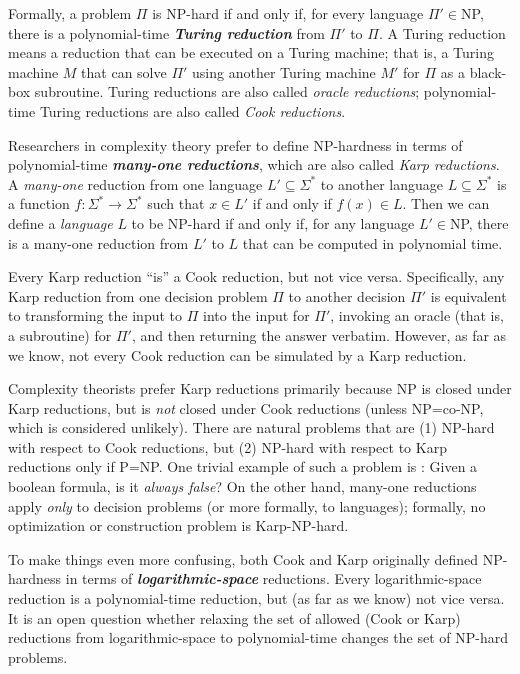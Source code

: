 Formally, a problem $\Pi$ is NP-hard if and only if, for every language $\Pi' \in{}$NP, there is a polynomial-time \textbf{\textit{Turing reduction}} from $\Pi'$ to $\Pi$.
A Turing reduction means a reduction that can be executed on a Turing machine; that is, a Turing machine $M$ that can solve $\Pi'$ using another Turing machine $M'$ for $\Pi$ as a black-box subroutine.
Turing reductions are also called \textit{oracle reductions}; polynomial-time Turing reductions are also called \textit{Cook reductions}.

Researchers in complexity theory prefer to define NP-hardness in terms of polynomial-time \textbf{\textit{many-one reductions}}, which are also called \textit{Karp reductions}.
A \textit{many-one} reduction from one language $L' \subseteq \Sigma^*$ to another language $L \subseteq \Sigma^*$ is a function $f : \Sigma^* \to \Sigma^*$ such that $x \in L'$ if and only if $f(x) \in L$.
Then we can define a \textit{language} $L$ to be NP-hard if and only if, for any language $L' \in{}$NP, there is a many-one reduction from $L'$ to $L$ that can be computed in polynomial time.

Every Karp reduction “is” a Cook reduction, but not vice versa.
Specifically, any Karp reduction from one decision problem $\Pi$ to another decision $\Pi'$ is equivalent to transforming the input to $\Pi$ into the input for $\Pi'$, invoking an oracle (that is, a subroutine) for $\Pi'$, and then returning the answer verbatim.
However, as far as we know, not every Cook reduction can be simulated by a Karp reduction.

Complexity theorists prefer Karp reductions primarily because NP is closed under Karp reductions, but is \textit{not} closed under Cook reductions (unless NP=co-NP, which is considered unlikely).
There are natural problems that are (1) NP-hard with respect to Cook reductions, but (2) NP-hard with respect to Karp reductions only if P=NP.
One trivial example of such a problem is : Given a boolean formula, is it \textit{always false}?
On the other hand, many-one reductions apply \textit{only} to decision problems (or more formally, to languages); formally, no optimization or construction problem is Karp-NP-hard.

To make things even more confusing, both Cook and Karp originally defined NP-hardness in terms of \textbf{\textit{logarithmic-space}} reductions.
Every logarithmic-space reduction is a polynomial-time reduction, but (as far as we know) not vice versa.
It is an open question whether relaxing the set of allowed (Cook or Karp) reductions from logarithmic-space to polynomial-time changes the set of NP-hard problems.

